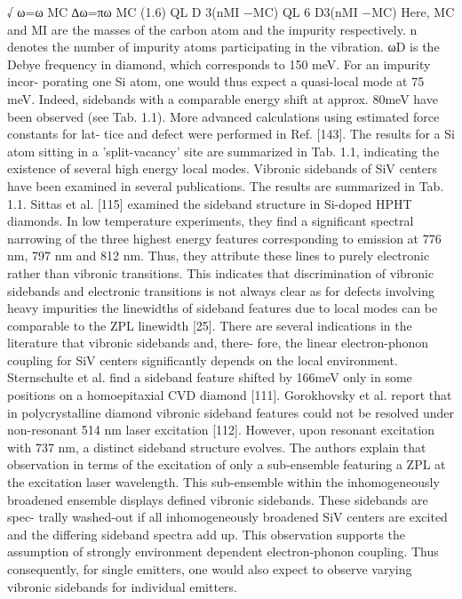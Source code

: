       √
      ω=ω MC ∆ω=πω MC (1.6) QL D 3(nMI −MC) QL 6 D3(nMI −MC)
      Here, MC and MI are the masses of the carbon atom and the impurity respectively. n denotes the number of impurity atoms participating in the vibration. ωD is the Debye frequency in diamond, which corresponds to 150 meV. For an impurity incor- porating one Si atom, one would thus expect a quasi-local mode at 75 meV. Indeed, sidebands with a comparable energy shift at approx. 80meV have been observed (see Tab. 1.1). More advanced calculations using estimated force constants for lat- tice and defect were performed in Ref. [143]. The results for a Si atom sitting in a ’split-vacancy’ site are summarized in Tab. 1.1, indicating the existence of several high energy local modes.
      Vibronic sidebands of SiV centers have been examined in several publications. The results are summarized in Tab. 1.1. Sittas et al. [115] examined the sideband structure in Si-doped HPHT diamonds. In low temperature experiments, they find a significant spectral narrowing of the three highest energy features corresponding to emission at 776 nm, 797 nm and 812 nm. Thus, they attribute these lines to purely electronic rather than vibronic transitions. This indicates that discrimination of vibronic sidebands and electronic transitions is not always clear as for defects involving heavy impurities the linewidths of sideband features due to local modes can be comparable to the ZPL linewidth [25].
      There are several indications in the literature that vibronic sidebands and, there- fore, the linear electron-phonon coupling for SiV centers significantly depends on the local environment. Sternschulte et al. find a sideband feature shifted by 166meV only in some positions on a homoepitaxial CVD diamond [111]. Gorokhovsky et al. report that in polycrystalline diamond vibronic sideband features could not be resolved under non-resonant 514 nm laser excitation [112]. However, upon resonant excitation with 737 nm, a distinct sideband structure evolves. The authors explain that observation in terms of the excitation of only a sub-ensemble featuring a ZPL at the excitation laser wavelength. This sub-ensemble within the inhomogeneously broadened ensemble displays defined vibronic sidebands. These sidebands are spec- trally washed-out if all inhomogeneously broadened SiV centers are excited and the differing sideband spectra add up. This observation supports the assumption of strongly environment dependent electron-phonon coupling. Thus consequently, for single emitters, one would also expect to observe varying vibronic sidebands for individual emitters.
